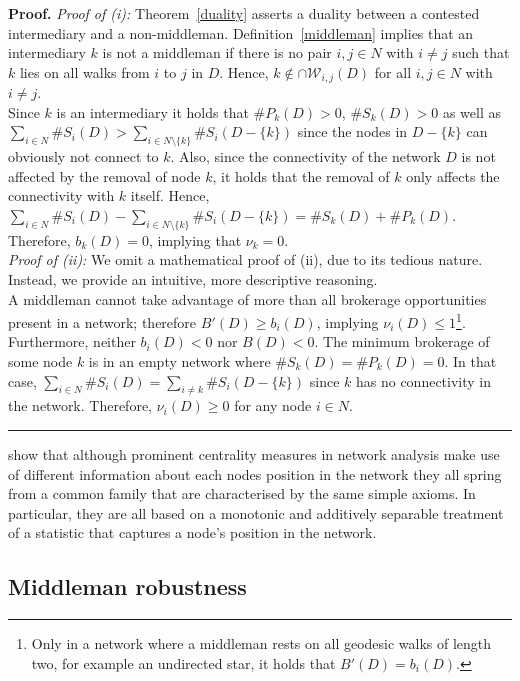 \documentclass[11pt,fleqn]{article}
\newenvironment{proof}[1][Proof]{\noindent \textbf{#1.} }{\hfill
\rule{0.5em}{0.5em}}
\begin{document}
\begin{proof}
\emph{Proof of (i):}
Theorem~\ref{duality} asserts a duality between a contested intermediary and a non-middleman. Definition~\ref{middleman} implies that an intermediary $k$ is not a middleman if there is no pair $i,j \in N$ with $i \neq j$ such that $k$ lies on all walks from $i$ to $j$ in $D$. Hence, $k \notin \cap \mathcal{W}_{i,j}(D)$ for all $i,j \in N$ with $i \neq j$.
\\
Since $k$ is an intermediary it holds that $\# P_{k}(D) > 0$, $\# S_{k}(D) > 0$ as well as $\sum_{i \in N} \# S_{i}(D) > \sum_{i \in N \setminus \{k\}} \# S_{i}(D - \{k\})$ since the nodes in $D - \{k\}$ can obviously not connect to $k$. Also, since the connectivity of the network $D$ is not affected by the removal of node $k$, it holds that the removal of $k$ only affects the connectivity with $k$ itself. Hence, $\sum_{i \in N} \# S_{i}(D) - \sum_{i \in N \setminus \{k\}} \# S_{i}(D - \{k\}) = \# S_{k}(D) + \# P_{k}(D)$. Therefore, $b_k (D) =0$, implying that $\nu_{k} = 0$.
\\[1.5ex]
\emph{Proof of (ii):}
We omit a mathematical proof of (ii), due to its tedious nature. Instead, we provide an intuitive, more descriptive reasoning. 
\\
A middleman cannot take advantage of more than all brokerage opportunities present in a network; therefore $B'(D) \geqslant b_{i}(D)$, implying $\nu_{i}(D) \leqslant 1$\footnote{Only in a network where a middleman rests on all geodesic walks of length two, for example an undirected star, it holds that $B'(D) = b_{i}(D)$.}.
\\
Furthermore, neither $b_{i}(D) < 0$ nor $B(D) < 0$. The minimum brokerage of some node $k$ is in an empty network where $\# S_{k}(D) = \# P_{k}(D) = 0$. In that case, $\sum_{i \in N} \# S_{i}(D) = \sum_{i \neq k} \# S_{i}(D - \{k\})$ since $k$ has no connectivity in the network. Therefore, $\nu_i (D) \geqslant 0$ for any node $i \in N$.
\end{proof}

\citet{BlochJackson2016} show that although prominent centrality measures in network analysis make use of different information about each nodes position in the network they all spring from a common family that are characterised by the same simple axioms. In particular, they are all based on a monotonic and additively separable treatment of a statistic that captures a node’s position in the network.

\subsection{Middleman robustness}
\end{document}
